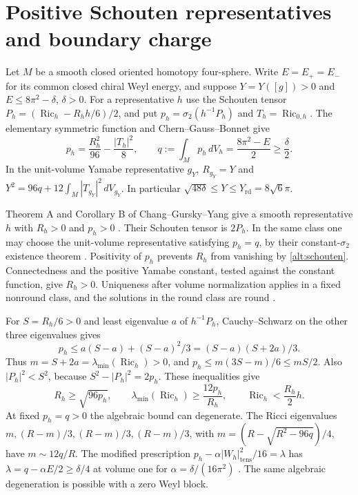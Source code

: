 
\section{Positive Schouten representatives and boundary charge}
\label{alt:gauge}

Let \(M\) be a smooth closed oriented homotopy four-sphere. Write
\(E=E_+=E_-\) for its common closed chiral Weyl energy, and suppose
\(Y=Y([g])>0\) and \(E\le 8\pi^2-\delta\), \(\delta>0\). For a
representative \(h\) use the Schouten tensor \(P_h=(\operatorname{Ric}_h-R_hh/6)/2\),
and put \(p_h=\sigma_2(h^{-1}P_h)\) and \(T_h=\operatorname{Ric}_{0,h}\).
The elementary symmetric function and Chern--Gauss--Bonnet give
\begin{equation}\label{alt:schouten}
 p_h=\frac{R_h^2}{96}-\frac{|T_h|^2}{8},\qquad
 q:=\int_M p_h\,dV_h=\frac{8\pi^2-E}{2}\ge \frac{\delta}{2}.
\end{equation}
In the unit-volume Yamabe representative \(g_Y\),
\(R_{g_Y}=Y\) and \(Y^2=96q+12\int_M|T_{g_Y}|^2\,dV_{g_Y}\).
In particular \(\sqrt{48\delta}\le Y\le Y_{\mathrm{rd}}=8\sqrt6\pi\).

Theorem A and Corollary B of Chang--Gursky--Yang give a smooth
representative \(h\) with \(R_h>0\) and \(p_h>0\)
\cite[Theorem A, Corollary B and Lemma 1.1]{ChangGurskyYang2002PositiveRicci}.
Their Schouten tensor is \(2P_h\). In the same class one may choose
the unit-volume representative satisfying \(p_h=q\), by their
constant-\(\sigma_2\) existence theorem
\cite[Theorem 1.2 and equation (1.6)]{ChangGurskyYang2003}.
Positivity of \(p_h\) prevents \(R_h\) from vanishing by
\eqref{alt:schouten}. Connectedness and the positive Yamabe
constant, tested against the constant function, give \(R_h>0\).
Uniqueness after volume normalization applies in a fixed nonround
class, and the solutions in the round class are round
\cite[Theorem 1.5]{GurskyStreets2018TwoYamabe}.

For \(S=R_h/6>0\) and least eigenvalue \(a\) of \(h^{-1}P_h\),
Cauchy--Schwarz on the other three eigenvalues gives
\[
 p_h\le a(S-a)+(S-a)^2/3=(S-a)(S+2a)/3.
\]
Thus \(m=S+2a=\lambda_{\min}(\operatorname{Ric}_h)>0\), and
\(p_h\le m(3S-m)/6\le mS/2\). Also \(|P_h|^2<S^2\), because
\(S^2-|P_h|^2=2p_h\). These inequalities give
\begin{equation}\label{alt:riccone}
 R_h\ge\sqrt{96p_h},\qquad
 \lambda_{\min}(\operatorname{Ric}_h)\ge\frac{12p_h}{R_h},
 \qquad \operatorname{Ric}_h<\frac{R_h}{2}h.
\end{equation}
At fixed \(p_h=q>0\) the algebraic bound can degenerate.
The Ricci eigenvalues \(m,(R-m)/3,(R-m)/3,(R-m)/3\), with
\(m=(R-\sqrt{R^2-96q})/4\), have \(m\sim12q/R\). The modified
prescription
\(p_h-\alpha |W_h|_{\mathrm{tens}}^2/16=\lambda\) has
\(\lambda=q-\alpha E/2\ge\delta/4\) at volume one for
\(\alpha=\delta/(16\pi^2)\)
\cite[Theorem 1.1 and equation (1.4)]{ChangGurskyYang2003}.
The same algebraic degeneration is possible with a zero Weyl block.

